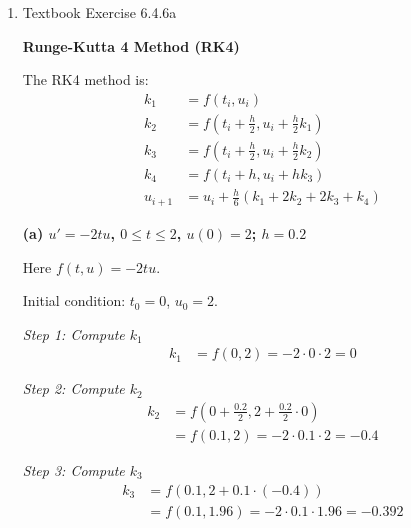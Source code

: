 \documentclass[reqno, answers]{exam}
\begin{document}
\begin{enumerate}
\begin{solution}
          \textbf{Result:} $\boxed{u_1 = 1.92}$ at $t_1 = 0.2$

          \textit{Comparison with exact solution:}
          \begin{align*}
            \hat{u}(0.2) = 2e^{-(0.2)^2} = 2e^{-0.04} \approx 1.9216
          \end{align*}

          Error: $|u_1 - \hat{u}(0.2)| = |1.92 - 1.9216| = 0.0016$
        \end{solution}
  \item Textbook Exercise 6.4.6a
        \begin{solution}
          \textbf{Runge-Kutta 4 Method (RK4)}

          The RK4 method is:
          \begin{align*}
            k_1     & = f(t_i, u_i)                                           \\
            k_2     & = f\left(t_i + \frac{h}{2}, u_i + \frac{h}{2}k_1\right) \\
            k_3     & = f\left(t_i + \frac{h}{2}, u_i + \frac{h}{2}k_2\right) \\
            k_4     & = f(t_i + h, u_i + hk_3)                                \\
            u_{i+1} & = u_i + \frac{h}{6}(k_1 + 2k_2 + 2k_3 + k_4)
          \end{align*}

          \medskip

          \textbf{(a) $u' = -2tu$, $0 \leq t \leq 2$, $u(0) = 2$; $h = 0.2$}

          Here $f(t,u) = -2tu$.

          Initial condition: $t_0 = 0$, $u_0 = 2$.

          \textit{Step 1: Compute $k_1$}
          \begin{align*}
            k_1 & = f(0, 2) = -2 \cdot 0 \cdot 2 = 0
          \end{align*}

          \textit{Step 2: Compute $k_2$}
          \begin{align*}
            k_2 & = f\left(0 + \frac{0.2}{2}, 2 + \frac{0.2}{2} \cdot 0\right) \\
                & = f(0.1, 2) = -2 \cdot 0.1 \cdot 2 = -0.4
          \end{align*}

          \textit{Step 3: Compute $k_3$}
          \begin{align*}
            k_3 & = f\left(0.1, 2 + 0.1 \cdot (-0.4)\right)         \\
                & = f(0.1, 1.96) = -2 \cdot 0.1 \cdot 1.96 = -0.392
          \end{align*}


\end{solution}
\end{enumerate}
\end{document}
